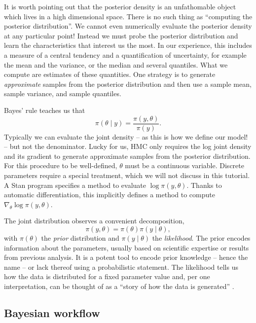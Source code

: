 It is worth pointing out that the posterior density is an unfathomable object which lives in a high dimensional space.
There is no such thing as ``computing the posterior distribution''.
We cannot even numerically evaluate the posterior density at any particular point!
Instead we must probe the posterior distribution and learn the characteristics that interest us the most.
In our experience, this includes a measure of a central tendency and a quantification of uncertainty, for example the mean and the variance, or the median and several quantiles.
What we compute are estimates of these quantities.
One strategy is to generate \textit{approximate} samples from the posterior distribution and then use a sample mean, sample variance, and sample quantiles.

Bayes' rule teaches us that
\begin{equation*}
  \pi(\theta \mid y) = \frac{\pi(y, \theta)}{\pi(y)}.
\end{equation*}
Typically we can evaluate the joint density -- as this is how we define our model! -- but not the denominator.
Lucky for us, HMC only requires the log joint density and its gradient to generate approximate samples from the posterior distribution.
For this procedure to be well-defined, $\theta$ must be a continuous variable.
Discrete parameters require a special treatment, which we will not discuss in this tutorial.
A Stan program specifies a method to evaluate $\log \pi(y, \theta)$.
Thanks to automatic differentiation, this implicitly defines a method to compute $\nabla_\theta \log \pi(y, \theta)$.

The joint distribution observes a convenient decomposition,
\begin{equation*}
  \pi(y, \theta) = \pi(\theta) \pi(y \mid \theta),
\end{equation*}
%
with $\pi(\theta)$ the \textit{prior} distribution and $\pi(y \mid \theta)$ the \textit{likelihood}.
The prior encodes information about the parameters, usually based on scientific expertise or results from previous analysis.
It is a potent tool to encode prior knowledge -- hence the name -- or lack thereof using a probabilistic statement.
The likelihood tells us how the data is distributed for a fixed parameter value and, per one interpretation, can be thought of as a ``story of how the data is generated'' \cite{Gelman:2013}.

\subsection{Bayesian workflow}

